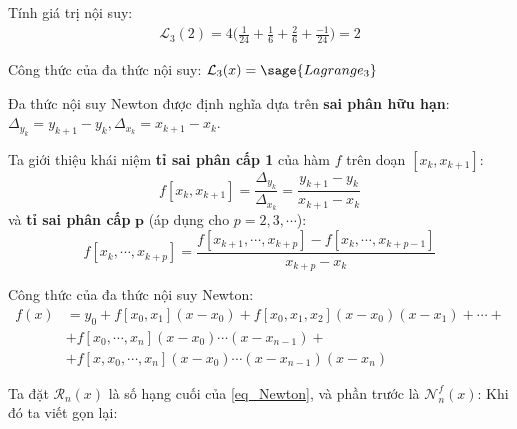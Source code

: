 \documentclass[12pt]{article}
\begin{document}
 Tính giá trị nội suy:
\begin{align*}
 \mathcal{L}_3(2)=4\Bigg( \frac{1}{24} + \frac{1}{6} + \frac{2}{6} + \frac{-1}{24}\Bigg) = 2
\end{align*}

Công thức của đa thức nội suy: $\mathcal{L}_3(x)=\sage{Lagrange_3}$

\newpage{}


Đa thức nội suy Newton được định nghĩa dựa trên \textbf{sai phân hữu hạn}: $\Delta_{y_k}=y_{k+1}-y_k, \Delta_{x_k}=x_{k+1}-x_k$.

Ta giới thiệu khái niệm \textbf{tỉ sai phân cấp 1} của hàm $f$ trên doạn $[x_k,x_{k+1}]$:
\begin{equation}
 f[x_k,x_{k+1}]=\frac{\Delta_{y_k}}{\Delta_{x_k}}=\frac{y_{k+1}-y_k}{x_{k+1}-x_k}
\end{equation}
và \textbf{tỉ sai phân cấp} $\mathbf{p}$ (áp dụng cho $p=2,3,\cdots$):
\begin{equation}
 f[x_k,\cdots,x_{k+p}]=\frac{f[x_{k+1},\cdots,x_{k+p}]-f[x_{k},\cdots,x_{k+p-1}]}{x_{k+p}-x_k}
\end{equation}

\newpage{}

Công thức của đa thức nội suy Newton:
\begin{align}\label{eq_Newton}
 f(x)&=y_0 + f[x_0,x_1](x-x_0) + f[x_0,x_1,x_2](x-x_0)(x-x_1) + \cdots + \nonumber \\
 &+f[x_0,\cdots,x_n](x-x_0)\cdots (x-x_{n-1}) + \nonumber \\
 &+f[x,x_0,\cdots,x_n](x-x_0)\cdots (x-x_{n-1})(x-x_{n})
\end{align}

Ta đặt $\mathcal{R}_n(x)$ là số hạng cuối của \eqref{eq_Newton}, và phần trước là $\mathcal{N}_n^f(x)$:
Khi đó ta viết gọn lại:
\end{document}
